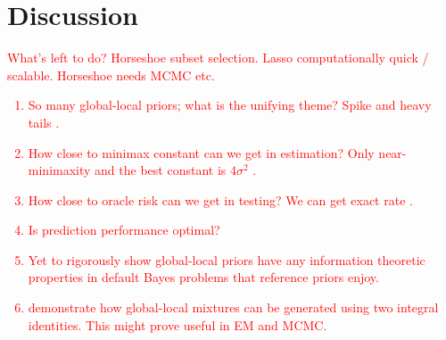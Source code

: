 \documentclass[11pt]{article}
\begin{document}


\section{Discussion}

\textcolor{red}{
What's left to do? Horseshoe subset selection. Lasso computationally quick / scalable. Horseshoe needs MCMC etc. 
\begin{enumerate}
\item So many global-local priors; what is the unifying theme? Spike and heavy tails \citet{polson2010shrink,van2015conditions}.
\item How close to minimax constant can we get in estimation? Only near-minimaxity and the best constant is $4\sigma^2$ \citep{van2017adaptive}.
\item How close to oracle risk can we get in testing? We can get exact rate \citep{ghosh2016testing}.
\item Is prediction performance optimal? 
\item Yet to rigorously show global-local priors have any information theoretic properties in default Bayes problems that reference priors \citep{berger_development_1992} enjoy.
\item \citet{bhadra2016global} demonstrate how global-local mixtures can be generated using two integral identities. This might prove useful in EM and MCMC.
\end{enumerate}
}
\end{document}
